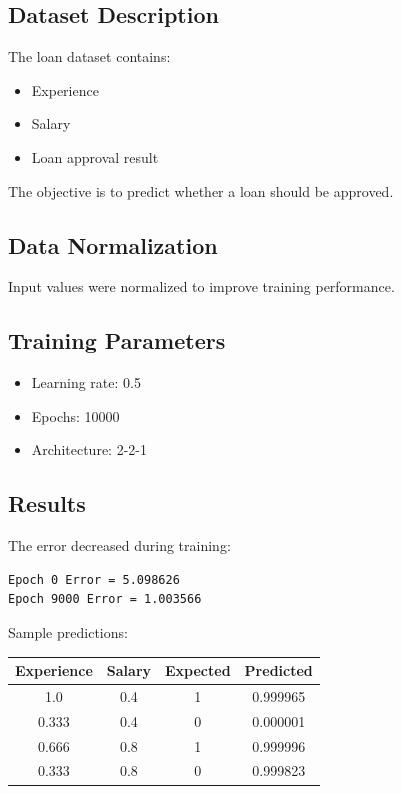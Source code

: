 \documentclass[a4paper,12pt]{article}
\begin{document}
\subsection{Dataset Description}

The loan dataset contains:
\begin{itemize}
    \item Experience
    \item Salary
    \item Loan approval result
\end{itemize}

The objective is to predict whether a loan should be approved.

\subsection{Data Normalization}

Input values were normalized to improve training performance.

\subsection{Training Parameters}

\begin{itemize}
    \item Learning rate: 0.5
    \item Epochs: 10000
    \item Architecture: 2-2-1
\end{itemize}

\subsection{Results}

The error decreased during training:

\begin{verbatim}
Epoch 0 Error = 5.098626
Epoch 9000 Error = 1.003566
\end{verbatim}

Sample predictions:

\begin{center}
\begin{tabular}{cccc}
\toprule
Experience & Salary & Expected & Predicted \\
\midrule
1.0 & 0.4 & 1 & 0.999965 \\
0.333 & 0.4 & 0 & 0.000001 \\
0.666 & 0.8 & 1 & 0.999996 \\
0.333 & 0.8 & 0 & 0.999823 \\
\bottomrule
\end{tabular}
\end{center}
\end{document}
